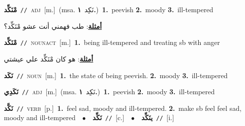 \documentclass[10pt,a4paper,twoside]{article} %
\begin{document}
\begin{multicols}{2}
{\setlength\topsep{0pt}\textbf{\foreignlanguage{arabic}{مْنَكِّد}}\ {\color{gray}\texttt{//}\color{black}}\ \textsc{adj}\ [m.]\ \color{gray}(msa. \foreignlanguage{arabic}{نَكِد}~\foreignlanguage{arabic}{\textbf{١.}})\color{black}\ \textbf{1.}~peevish  \textbf{2.}~moody  \textbf{3.}~ill-tempered\  \begin{flushright}\color{gray}\foreignlanguage{arabic}{\textbf{\underline{\foreignlanguage{arabic}{أمثلة}}}: طب فهمني أنت عشو مْنَكِّد؟}\end{flushright}\color{black}} \vspace{2mm}

{\setlength\topsep{0pt}\textbf{\foreignlanguage{arabic}{مْنَكِّد}}\ {\color{gray}\texttt{//}\color{black}}\ \textsc{noun\textunderscore act}\ [m.]\ \textbf{1.}~being ill-tempered and treating sb with anger\  \begin{flushright}\color{gray}\foreignlanguage{arabic}{\textbf{\underline{\foreignlanguage{arabic}{أمثلة}}}: هو كان مْنَكِّد علي عيشتي}\end{flushright}\color{black}} \vspace{2mm}

{\setlength\topsep{0pt}\textbf{\foreignlanguage{arabic}{نَكَد}}\ {\color{gray}\texttt{//}\color{black}}\ \textsc{noun}\ [m.]\ \textbf{1.}~the state of being peevish.  \textbf{2.}~moody  \textbf{3.}~ill-tempered\ } \vspace{2mm}

{\setlength\topsep{0pt}\textbf{\foreignlanguage{arabic}{نَكَدِي}}\ {\color{gray}\texttt{//}\color{black}}\ \textsc{adj}\ [m.]\ \color{gray}(msa. \foreignlanguage{arabic}{نَكِد}~\foreignlanguage{arabic}{\textbf{١.}})\color{black}\ \textbf{1.}~peevish  \textbf{2.}~moody  \textbf{3.}~ill-tempered\ } \vspace{2mm}

{\setlength\topsep{0pt}\textbf{\foreignlanguage{arabic}{نَكَّد}}\ {\color{gray}\texttt{//}\color{black}}\ \textsc{verb}\ [p.]\ \textbf{1.}~feel sad, moody and ill-tempered.  \textbf{2.}~make sb feel feel sad, moody and ill-tempered\ \ $\bullet$\ \ \setlength\topsep{0pt}\textbf{\foreignlanguage{arabic}{نَكِّد}}\ {\color{gray}\texttt{//}\color{black}}\ [c.]\ \ $\bullet$\ \ \setlength\topsep{0pt}\textbf{\foreignlanguage{arabic}{ينَكِّد}}\ {\color{gray}\texttt{//}\color{black}}\ [i.]\ } \vspace{2mm}


\end{multicols}
\end{document}
